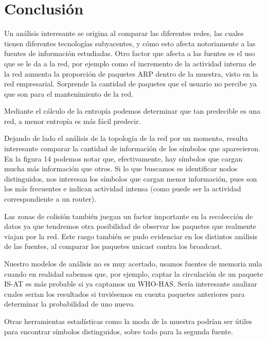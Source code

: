 \section{Conclusión}

Un análisis interesante se origina al comparar las diferentes redes, las cuales tienen diferentes tecnologías subyacentes, y cómo esto afecta notoriamente a las fuentes de información estudiadas. Otro factor que afecta a las fuentes es el uso que se le da a la red, por ejemplo como el incremento de la actividad interna de la red aumenta la proporción de paquetes ARP dentro de la muestra, visto en la red empresarial. Sorprende la cantidad de paquetes que el usuario no percibe ya que son para el mantenimiento de la red.

Mediante el cálculo de la entropía podemos determinar que tan predecible es una red, a menor entropía es más fácil predecir.

Dejando de lado el análisis de la topología de la red por un momento, resulta interesante comparar la cantidad de información de los símbolos que aparecieron. En la figura 14 podemos notar que, efectivamente, hay símbolos que cargan mucha más información que otros. Si lo que buscamos es identificar nodos distinguidos, nos interesan los símbolos que cargan menor información, pues son los más frecuentes e indican actividad intensa (como puede ser la actividad correspondiente a un router).

Las zonas de colisión también juegan un factor importante en la recolección de datos ya que tendremos otra posibilidad de observar los paquetes que realmente viajan por la red. Este rasgo también se pudo evidenciar en los distintos análisis de las fuentes, al comparar los paquetes unicast contra los broadcast.

Nuestro modelos de análisis no es muy acertado, usamos fuentes de memoria nula cuando en realidad sabemos que, por ejemplo, captar la circulación de un paquete IS-AT es más probable si ya captamos un WHO-HAS. Sería interesante analizar cuales serian los resultados si tuviésemos en cuenta paquetes anteriores para determinar la probabilidad de uno nuevo.

Otras herramientas estadísticas como la moda de la muestra podrían ser útiles para encontrar símbolos distinguidos, sobre todo para la segunda fuente.

